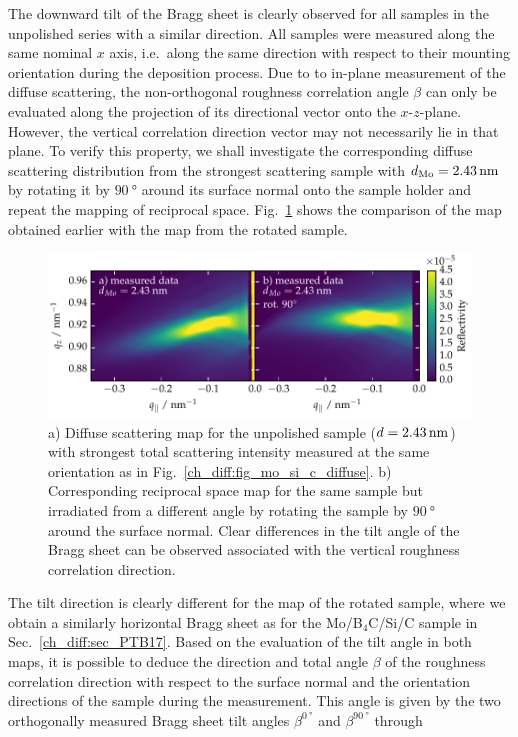 The downward tilt of the Bragg sheet is clearly observed for all samples in the unpolished series with a similar direction. All samples were measured along the same nominal $x$ axis, i.e.~along the same direction with respect to their mounting orientation during the deposition process. Due to to in-plane measurement of the diffuse scattering, the non-orthogonal roughness correlation angle $\beta$ can only be evaluated along the projection of its directional vector onto the $x$-$z$-plane. However, the vertical correlation direction vector may not necessarily lie in that plane. To verify this property, we shall investigate the corresponding diffuse scattering distribution from the strongest scattering sample with $d_\text{Mo} = \nm{2.43}$ by rotating it by $\SI{90}{\degree}$ around its surface normal onto the sample holder and repeat the mapping of reciprocal space. Fig.~\ref{ch_diff:fig_diffuse_tilt_vs_notilt} shows the comparison of the map obtained earlier with the map from the rotated sample.
\begin{figure}[htbp]
\centering
\includegraphics[width=\textwidth]{img/MoSiC_diffuse_tilt_vs_notilt}
\caption{a) Diffuse scattering map for the unpolished sample ($d=\nm{2.43}$) with strongest total scattering intensity measured at the same orientation as in Fig.~\ref{ch_diff:fig_mo_si_c_diffuse}. b) Corresponding reciprocal space map for the same sample but irradiated from a different angle by rotating the sample by $\SI{90}{\degree}$ around the surface normal. Clear differences in the tilt angle of the Bragg sheet can be observed associated with the vertical roughness correlation direction.}
\label{ch_diff:fig_diffuse_tilt_vs_notilt}
\end{figure}
The tilt direction is clearly different for the map of the rotated sample, where we obtain a similarly horizontal Bragg sheet as for the Mo/B$_4$C/Si/C sample in Sec.~\ref{ch_diff:sec_PTB17}. Based on the evaluation of the tilt angle in both maps, it is possible to deduce the direction and total angle $\beta$ of the roughness correlation direction with respect to the surface normal and the orientation directions of the sample during the measurement. This angle is given by the two orthogonally measured Bragg sheet tilt angles $\beta^{\SI{0}{\degree}}$ and $\beta^{\SI{90}{\degree}}$ through
